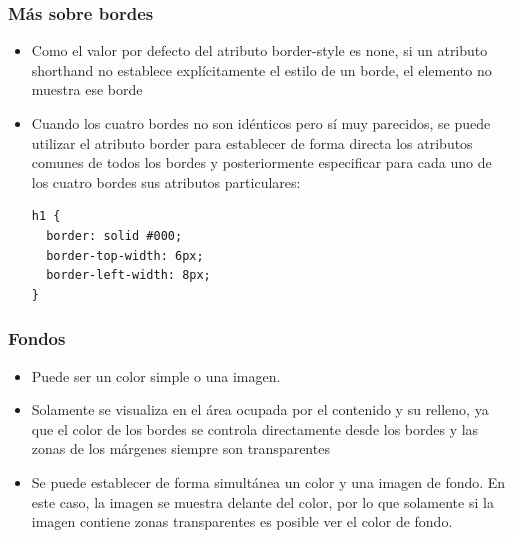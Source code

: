 \documentclass[ucs]{beamer}
\begin{document}

\begin{frame}[fragile]
\frametitle{Más sobre bordes}

\begin{itemize}
  \item Como el valor por defecto del atributo border-style es none, si un atributo shorthand no establece explícitamente el estilo de un borde, el elemento no muestra ese borde
  \item Cuando los cuatro bordes no son idénticos pero sí muy parecidos, se puede utilizar el atributo border para establecer de forma directa los atributos comunes de todos los bordes y posteriormente especificar para cada uno de los cuatro bordes sus atributos particulares:
\begin{verbatim}
h1 {
  border: solid #000;
  border-top-width: 6px;
  border-left-width: 8px;
}
\end{verbatim}
\end{itemize}

\end{frame}


\begin{frame}
\frametitle{Fondos}

\begin{itemize}
  \item Puede ser un color simple o una imagen.
  \item Solamente se visualiza en el área ocupada por el contenido y su relleno, ya que el color de los bordes se controla directamente desde los bordes y las zonas de los márgenes siempre son transparentes
  \item Se puede establecer de forma simultánea un color y una imagen de fondo. En este caso, la imagen se muestra delante del color, por lo que solamente si la imagen contiene zonas transparentes es posible ver el color de fondo.
\end{itemize}

\end{frame}


\end{document}
